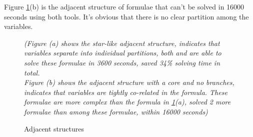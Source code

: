 Figure \ref{fig:cs}(b) is the adjacent structure of formulae that can't be solved in 16000 seconds using both tools. It's obvious that there is no clear partition among the variables.

\begin{figure}[t]
\centering
{}
\caption{Adjacent structures}
\begin{minipage}[t]{0.9\textwidth} \small
\textit{(Figure (a) shows the star-like adjacent structure, indicates that variables separate into individual partitions, both \tool and \minibones are able to solve these formulae in 3600 seconds, \tool saved 34\% solving time in total. \\
Figure (b) shows the adjacent structure with a core and no branches, indicates that variables are tightly co-related in the formula. These formulae are more complex than the formula in \ref{fig:cs}(a), \tool solved 2 more formulae than \minibones among these formulae, within 16000 seconds)}
\end{minipage}

\label{fig:cs}
\end{figure}

